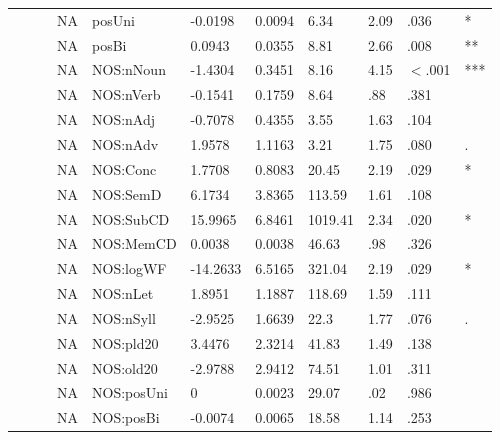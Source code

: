 \begin{table}[ht]
\begin{tabular}{lllllllllll}
   &  &  & NA & posUni & -0.0198 & 0.0094 & 6.34 & 2.09 & .036 & * \\ 
   &  &  & NA & posBi & 0.0943 & 0.0355 & 8.81 & 2.66 & .008 & ** \\ 
   &  &  & NA & NOS:nNoun & -1.4304 & 0.3451 & 8.16 & 4.15 & $<$.001 & *** \\ 
   &  &  & NA & NOS:nVerb & -0.1541 & 0.1759 & 8.64 & .88 & .381 &   \\ 
   &  &  & NA & NOS:nAdj & -0.7078 & 0.4355 & 3.55 & 1.63 & .104 &   \\ 
   &  &  & NA & NOS:nAdv & 1.9578 & 1.1163 & 3.21 & 1.75 & .080 & . \\ 
   &  &  & NA & NOS:Conc & 1.7708 & 0.8083 & 20.45 & 2.19 & .029 & * \\ 
   &  &  & NA & NOS:SemD & 6.1734 & 3.8365 & 113.59 & 1.61 & .108 &   \\ 
   &  &  & NA & NOS:SubCD & 15.9965 & 6.8461 & 1019.41 & 2.34 & .020 & * \\ 
   &  &  & NA & NOS:MemCD & 0.0038 & 0.0038 & 46.63 & .98 & .326 &   \\ 
   &  &  & NA & NOS:logWF & -14.2633 & 6.5165 & 321.04 & 2.19 & .029 & * \\ 
   &  &  & NA & NOS:nLet & 1.8951 & 1.1887 & 118.69 & 1.59 & .111 &   \\ 
   &  &  & NA & NOS:nSyll & -2.9525 & 1.6639 & 22.3 & 1.77 & .076 & . \\ 
   &  &  & NA & NOS:pld20 & 3.4476 & 2.3214 & 41.83 & 1.49 & .138 &   \\ 
   &  &  & NA & NOS:old20 & -2.9788 & 2.9412 & 74.51 & 1.01 & .311 &   \\ 
   &  &  & NA & NOS:posUni & 0 & 0.0023 & 29.07 & .02 & .986 &   \\ 
   &  &  & NA & NOS:posBi & -0.0074 & 0.0065 & 18.58 & 1.14 & .253 &   \\ 
   \hline
\end{tabular}
\endgroup
\end{table}
